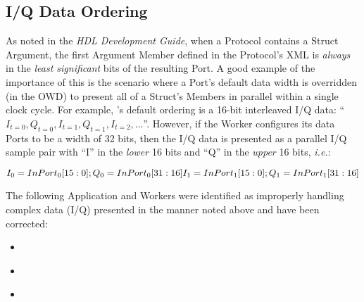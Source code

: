 \subsection{I/Q Data Ordering} %
\label{sec:14_iqdata}
As noted in the \textit{HDL Development Guide}, when a Protocol contains a Struct Argument, the first Argument Member defined in the Protocol's XML is \textit{always} in the \textit{least significant} bits of the resulting Port. A good example of the importance of this is the scenario where a Port's default data width is overridden (in the OWD) to present all of a Struct's Members in parallel within a single clock cycle. For example, 's default ordering is a 16-bit interleaved I/Q data: ``$I_{t=0}, Q_{t=0}, I_{t=1}, Q_{t=1}, I_{t=2}, ...$''. However, if the Worker configures its data Ports to be a width of 32 bits, then the I/Q data is presented as a parallel I/Q sample pair with ``I'' in the \textit{lower} 16 bits and ``Q'' in the \textit{upper} 16 bits, \textit{i.e.}:
\begin{center}
$I_{0}=InPort_{0}[15:0]; Q_{0}=InPort_{0}[31:16]\newline
I_{1}=InPort_{1}[15:0]; Q_{1}=InPort_{1}[31:16]\newline
$
\end{center}
The following Application and Workers were identified as improperly handling  complex data (I/Q) presented in the manner noted above and have been corrected:
\begin{itemize}
\setlength\itemsep{0em} %
\item {}
\begin{multicols}{3}
\subitem {}
\subitem {}
\subitem {}\footnotemark
\subitem {}\footnotemark[\value{footnote}]
\subitem {}
\subitem {}
\subitem {}
\subitem {}
\subitem {}
\subitem {}
\end{multicols}
\item {}
\begin{multicols}{3}
\subitem {}
\subitem {}
\subitem {}
\end{multicols}
\item {}
\begin{multicols}{3}
\subitem {}
\subitem {}
\end{multicols}
\end{itemize}

